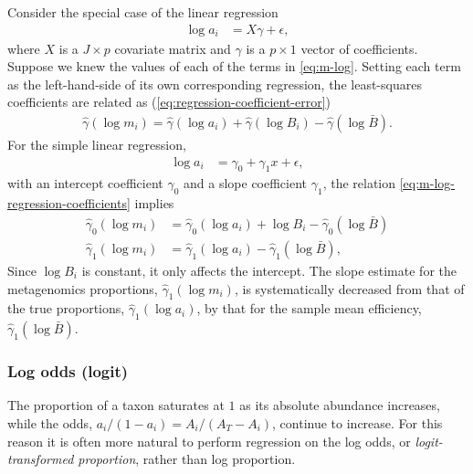 \documentclass[
]{article}
\theoremstyle{definition}
\theoremstyle{definition}
\theoremstyle{definition}
\theoremstyle{definition}
\theoremstyle{remark}
\begin{document}
Consider the special case of the linear regression
\begin{align}
  \log a_i &= X \gamma + \epsilon,
\end{align}
where \(X\) is a \(J\times p\) covariate matrix and \(\gamma\) is a \(p\times 1\) vector of coefficients.
Suppose we knew the values of each of the terms in \eqref{eq:m-log}.
Setting each term as the left-hand-side of its own corresponding regression, the least-squares coefficients are related as (\eqref{eq:regression-coefficient-error})
\begin{align}
  \label{eq:m-log-regression-coefficients}
  \hat \gamma{(\log m_i)} = \hat \gamma{(\log a_i)} + \hat \gamma{(\log B_i)} - \hat \gamma{(\log \bar B)}.
\end{align}
For the simple linear regression,
\begin{align}
  \log a_i &= \gamma_0 + \gamma_1 x + \epsilon,
\end{align}
with an intercept coefficient \(\gamma_0\) and a slope coefficient \(\gamma_1\), the relation \eqref{eq:m-log-regression-coefficients} implies
\begin{align}
  \label{eq:m-log-simple-regression-coefficients}
  \hat \gamma_0{(\log m_i)} &= \hat \gamma_0{(\log a_i)} + \log B_i - \hat \gamma_0{(\log \bar B)} \\
  \hat \gamma_1{(\log m_i)} &= \hat \gamma_1{(\log a_i)} - \hat \gamma_1{(\log \bar B)},
\end{align}
Since \(\log B_i\) is constant, it only affects the intercept.
The slope estimate for the metagenomics proportions, \(\hat \gamma_1{(\log m_i)}\), is systematically decreased from that of the true proportions, \(\hat \gamma_1{(\log a_i)}\), by that for the sample mean efficiency, \(\hat \gamma_1{(\log \bar B)}\).

\hypertarget{log-odds-logit}{%
\subsubsection{Log odds (logit)}\label{log-odds-logit}}

The proportion of a taxon saturates at \(1\) as its absolute abundance increases, while the odds, \(a_i / (1 - a_i) = A_i / (A_T - A_i)\), continue to increase.
For this reason it is often more natural to perform regression on the log odds, or \emph{logit-transformed proportion}, rather than log proportion.
\end{document}
